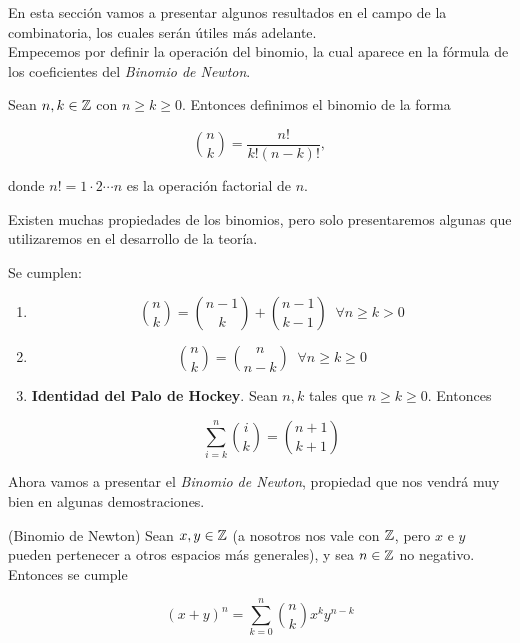 En esta sección vamos a presentar algunos resultados en el campo de la combinatoria, los cuales serán útiles más adelante.\\

Empecemos por definir la operación del binomio, la cual aparece en la fórmula de los coeficientes del \textit{Binomio de Newton}.

\begin{definicion}
	Sean $n, k \in \mathbb{Z}$ con $n \geq k \geq 0$. Entonces definimos el binomio de la forma
	
	\begin{equation}\label{formula_binomio}
	\binom{n}{k} = \frac{n!}{k!(n - k)!},
	\end{equation}
	
	donde $n! = 1\cdot2\dotsm n$ es la operación factorial de $n$.
\end{definicion}

Existen muchas propiedades de los binomios, pero solo presentaremos algunas que utilizaremos en el desarrollo de la teoría.

\begin{proposicion}\label{propiedades_binomio}
	Se cumplen:
	
	\begin{enumerate}
		\item \[ \binom{n}{k} = \binom{n-1}{k} + \binom{n-1}{k-1}\;\;\forall n \geq k > 0 \]
		
		\item \[ \binom{n}{k} = \binom{n}{n-k}\;\;\forall n \geq k \geq 0 \]
		
		\item \textbf{Identidad del Palo de Hockey}. Sean $n, k$ tales que $n \geq k \geq 0$. Entonces
		
		\begin{equation}\label{identidad_del_palo_de_hockey}
		\sum_{i=k}^{n}\binom{i}{k} = \binom{n+1}{k+1}
		\end{equation}
	\end{enumerate}
\end{proposicion}

Ahora vamos a presentar el \textit{Binomio de Newton}, propiedad que nos vendrá muy bien en algunas demostraciones.

\begin{teorema}{(Binomio de Newton)}\label{binomio_de_newton}
	Sean $x, y \in \mathbb{Z}$ (a nosotros nos vale con $\mathbb{Z}$, pero $x$ e $y$ pueden pertenecer a otros espacios más generales), y sea $n \in \mathbb{Z}$ no negativo. Entonces se cumple
	
	\[ (x + y)^n = \sum_{k=0}^{n}\binom{n}{k}x^ky^{n-k} \]
\end{teorema}


